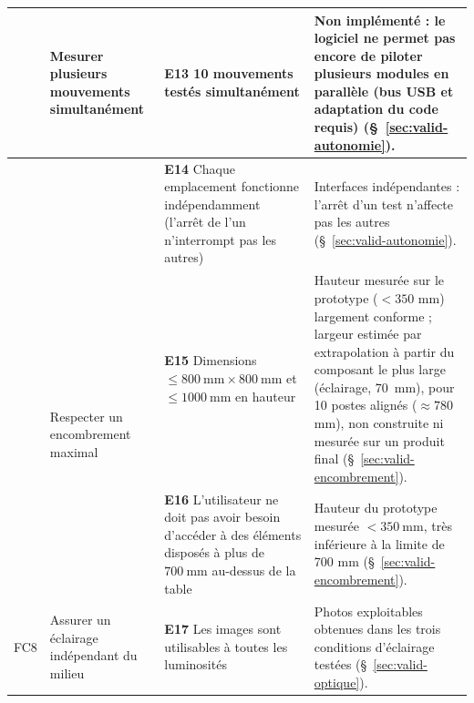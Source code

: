 \begin{landscape}
\begin{longtable}{|>{\raggedright\arraybackslash}p{1cm}|p{4.5cm}|p{7.5cm}|p{8cm}|}
\multirow{2}{*}{FC6} & \multirow{2}{4.5cm}{Mesurer plusieurs mouvements simultanément}
    & \cellcolor{resAFaire}\rule[-0.4\baselineskip]{0pt}{1.8\baselineskip}\textbf{E13} 10 mouvements testés simultanément
    & \rule[-0.4\baselineskip]{0pt}{1.8\baselineskip}Non implémenté : le logiciel ne permet pas encore de piloter plusieurs modules en parallèle (bus USB et adaptation du code requis) (§~\ref{sec:valid-autonomie}). \\
\cline{3-4}
 & & \cellcolor{resConforme}\rule[-0.4\baselineskip]{0pt}{1.8\baselineskip}\textbf{E14} Chaque emplacement fonctionne indépendamment (l'arrêt de l'un n'interrompt pas les autres)
    & \rule[-0.4\baselineskip]{0pt}{1.8\baselineskip}Interfaces indépendantes : l'arrêt d'un test n'affecte pas les autres (§~\ref{sec:valid-autonomie}). \\
\hline

\multirow{2}{*}{FC7} & \multirow{2}{4.5cm}{Respecter un encombrement maximal}
    & \cellcolor{resPartiel}\rule[-0.4\baselineskip]{0pt}{1.8\baselineskip}\textbf{E15} Dimensions $\leq 800\ \mathrm{mm} \times 800\ \mathrm{mm}$ et $\leq 1000\ \mathrm{mm}$ en hauteur
    & \rule[-0.4\baselineskip]{0pt}{1.8\baselineskip}Hauteur mesurée sur le prototype ($< 350$ mm) largement conforme ; largeur estimée par extrapolation à partir du composant le plus large (éclairage, 70~mm), pour 10 postes alignés ($\approx 780$ mm), non construite ni mesurée sur un produit final (§~\ref{sec:valid-encombrement}). \\
\cline{3-4}
 & & \cellcolor{resConforme}\rule[-0.4\baselineskip]{0pt}{1.8\baselineskip}\textbf{E16} L'utilisateur ne doit pas avoir besoin d'accéder à des éléments disposés à plus de $700\ \mathrm{mm}$ au-dessus de la table
    & \rule[-0.4\baselineskip]{0pt}{1.8\baselineskip}Hauteur du prototype mesurée $< 350\ \mathrm{mm}$, très inférieure à la limite de 700 mm (§~\ref{sec:valid-encombrement}). \\
\hline

FC8 & Assurer un éclairage indépendant du milieu
    & \cellcolor{resConforme}\rule[-0.4\baselineskip]{0pt}{1.8\baselineskip}\textbf{E17} Les images sont utilisables à toutes les luminosités
    & \rule[-0.4\baselineskip]{0pt}{1.8\baselineskip}Photos exploitables obtenues dans les trois conditions d'éclairage testées (§~\ref{sec:valid-optique}). \\
\hline

\end{longtable}
\end{landscape}

